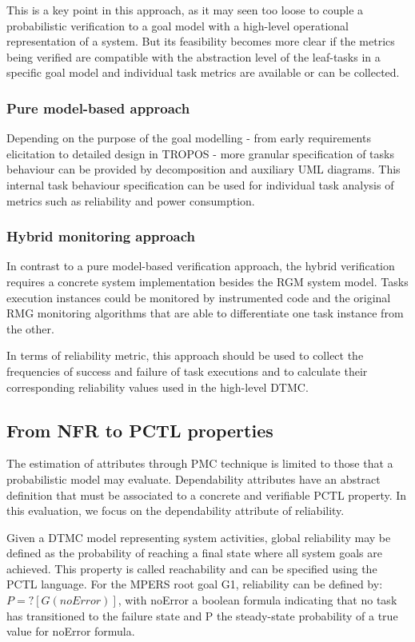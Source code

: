 This is a key point in this approach, as it may seen too loose to couple a probabilistic verification to a goal model with a high-level operational representation of a system. But its feasibility becomes more clear if the metrics being verified are compatible with the abstraction level of the leaf-tasks in a specific goal model and individual task metrics are available or can be collected. 

\subsubsection{Pure model-based approach}

Depending on the purpose of the goal modelling - from early requirements elicitation to detailed design in TROPOS - more granular specification of tasks behaviour can be provided by decomposition and auxiliary UML diagrams. This internal task behaviour specification can be used for individual task analysis of metrics such as reliability and power consumption. 

\subsubsection{Hybrid monitoring approach}

In contrast to a pure model-based verification approach, the hybrid verification requires a concrete system implementation besides the RGM system model. Tasks execution instances could be monitored by instrumented code and the original RMG monitoring algorithms that are able to differentiate one task instance from the other. 

In terms of reliability metric, this approach should be used to collect the frequencies of success and failure of task executions and to calculate their corresponding reliability values used in the high-level DTMC.

\subsection{From NFR to PCTL properties}

The estimation of attributes through PMC technique is limited to those that a probabilistic model may evaluate. Dependability attributes have an abstract definition that must be associated to a concrete and verifiable PCTL property. In this evaluation, we focus on the dependability attribute of reliability. 

Given a DTMC model representing system activities, global reliability may be defined as the probability of reaching a final state where all system goals are achieved. This property is called reachability and can be specified using the PCTL language. For the MPERS root goal G1, reliability can be defined by: $ P=? [ G (noError) ] $, with noError a boolean formula indicating that no task has transitioned to the failure state and P the steady-state probability of a true value for noError formula.


